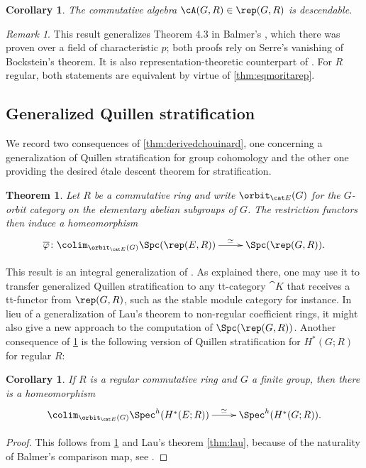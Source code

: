\documentclass{amsart}%
\numberwithin{equation}{section}%
\newtheorem{Thm}[equation]{Theorem}
\newtheorem{Cor}[equation]{Corollary}
\theoremstyle{remark}
\newtheorem{Rem}[equation]{Remark}
\begin{document}
\begin{Cor}\label{cor:descendable}
The commutative algebra $\cA(G,R) \in \rep(G,R)$ is descendable.
\end{Cor}

\begin{Rem}
This result generalizes Theorem 4.3 in Balmer's \cite{Balmer16b}, which there was proven over a field of characteristic $p$; both proofs rely on Serre's vanishing of Bockstein's theorem. It is also representation-theoretic counterpart of \cite[Prop.~5.25]{mnn_derivedinduction}. For $R$ regular, both statements are equivalent by virtue of \cref{thm:eqmoritarep}.
\end{Rem}



\subsection{Generalized Quillen stratification}

We record two consequences of \cref{thm:derivedchouinard}, one concerning a generalization of Quillen stratification for group cohomology and the other one providing the desired \'etale descent theorem for stratification.

\begin{Thm}\label{thm:genquillenstrat}
Let $R$ be a commutative ring and write $\orbit_{\cat E}(G)$ for the $G$-orbit category on the elementary abelian subgroups of $G$. The restriction functors then induce a homeomorphism
\[
\xymatrix{\overline{\varphi}\colon \colim_{\orbit_{\cat E}(G)}\Spc(\rep(E,R)) \ar[r]^-{\simeq} & \Spc(\rep(G,R)).}
\]
\end{Thm}

This result is an integral generalization of \cite[Thm.~4.10]{Balmer16b}. As explained there, one may use it to transfer generalized Quillen stratification to any tt-category $\cat K$ that receives a tt-functor from $\rep(G,R)$, such as the stable module category for instance. In lieu of a generalization of Lau's theorem to non-regular coefficient rings, it might also give a new approach to the computation of $\Spc(\rep(G,R))$. Another consequence of \cref{thm:genquillenstrat} is the following version of Quillen stratification for $H^*(G;R)$ for regular $R$:

\begin{Cor}\label{cor:quillenstratification}
If $R$ is a regular commutative ring and $G$ a finite group, then there is a homeomorphism
\[
\xymatrix{\colim_{\orbit_{\cat E}(G)}\Spec^h(H^*(E;R)) \ar[r]^-{\simeq} & \Spec^h(H^*(G;R)).}
\]
\end{Cor}
\begin{proof}
This follows from \cref{thm:genquillenstrat} and Lau's theorem \cref{thm:lau}, because of the naturality of Balmer's comparison map, see \cite[Thm.~5.3]{Balmer10b}. 
\end{proof}
\end{document}
